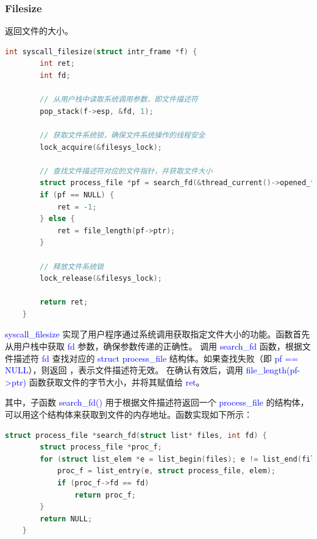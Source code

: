 \documentclass[14pt,a4paper,UTF8,twoside]{article}
\renewcommand{\texttt}[1]{\textcolor{blue}{\ttfamily #1}}
\begin{document}
\subsubsection{Filesize}

返回文件的大小。

\begin{lstlisting}[language=C, title= syscall\_filesize()]
    int syscall_filesize(struct intr_frame *f) {
        int ret; 
        int fd;
        
        // 从用户栈中读取系统调用参数，即文件描述符
        pop_stack(f->esp, &fd, 1);
        
        // 获取文件系统锁，确保文件系统操作的线程安全
        lock_acquire(&filesys_lock);
        
        // 查找文件描述符对应的文件指针，并获取文件大小
        struct process_file *pf = search_fd(&thread_current()->opened_files, fd);
        if (pf == NULL) {
            ret = -1; 
        } else {
            ret = file_length(pf->ptr); 
        }
        
        // 释放文件系统锁
        lock_release(&filesys_lock);
        
        return ret; 
    }
\end{lstlisting}
    
\begin{ctt}
    \texttt{syscall\_filesize} 实现了用户程序通过系统调用获取指定文件大小的功能。函数首先从用户栈中获取 \texttt{fd} 参数，确保参数传递的正确性。
    调用 \texttt{search\_fd} 函数，根据文件描述符 \texttt{fd} 查找对应的 \texttt{struct process\_file} 结构体。如果查找失败（即 \texttt{pf == NULL}），则返回 \texttt{-1}，表示文件描述符无效。
    在确认有效后，调用 \texttt{file\_length(pf->ptr)} 函数获取文件的字节大小，并将其赋值给 \texttt{ret}。
\end{ctt}

其中，子函数 \texttt{search\_fd()} 用于根据文件描述符返回一个 \texttt{process\_file} 的结构体，
可以用这个结构体来获取到文件的内存地址。函数实现如下所示：

\begin{lstlisting}[language=C, title= search\_fd()]
    struct process_file *search_fd(struct list* files, int fd) {
        struct process_file *proc_f;
        for (struct list_elem *e = list_begin(files); e != list_end(files); e = list_next(e)) {
            proc_f = list_entry(e, struct process_file, elem);
            if (proc_f->fd == fd)
                return proc_f;
        }
        return NULL;
    }
\end{lstlisting}
\end{document}
